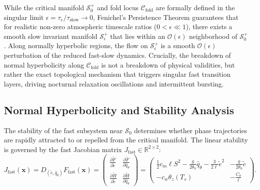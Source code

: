 \begin{remark}
\label{rem:fenichel_persistence}
While the critical manifold $\mathcal{S}_0^+$ and fold locus $\mathcal{C}_{\mathrm{fold}}$ are formally defined in the singular limit $\epsilon = \tau_e / \tau_{\mathrm{slow}} \to 0$, Fenichel's Persistence Theorem \citep{Fenichel1979} guarantees that for realistic non-zero atmospheric timescale ratios ($0 < \epsilon \ll 1$), there exists a smooth slow invariant manifold $\mathcal{S}_\epsilon^+$ that lies within an $\mathcal{O}(\epsilon)$ neighborhood of $\mathcal{S}_0^+$. Along normally hyperbolic regions, the flow on $\mathcal{S}_\epsilon^+$ is a smooth $\mathcal{O}(\epsilon)$ perturbation of the reduced fast-slow dynamics. Crucially, the breakdown of normal hyperbolicity along $\mathcal{C}_{\mathrm{fold}}$ is not a breakdown of physical validities, but rather the exact topological mechanism that triggers singular fast transition layers, driving nocturnal relaxation oscillations and intermittent bursting.
\end{remark}

\subsection{Normal Hyperbolicity and Stability Analysis}

The stability of the fast subsystem near $\mathcal{S}_0$ determines whether phase trajectories are rapidly attracted to or repelled from the critical manifold. The linear stability is governed by the fast Jacobian matrix $J_{\mathrm{fast}} \in \mathbb{R}^{2 \times 2}$:
\begin{equation}
J_{\mathrm{fast}}(\mathbf{x}) = D_{(\tilde e, \hat q_\theta)} F_{\mathrm{fast}}(\mathbf{x}) =
\begin{pmatrix}
\frac{\partial \tilde F}{\partial \tilde e} & \frac{\partial \tilde F}{\partial \hat q_\theta} \\[6pt]
\frac{\partial \tilde H}{\partial \tilde e} & \frac{\partial \tilde H}{\partial \hat q_\theta}
\end{pmatrix}
=
\begin{pmatrix}
\frac{1}{2} c_m \ell S^2 - \frac{g}{2\theta_0} \hat q_\theta - \frac{3}{2\ell} \tilde e^2 & -\frac{g}{2\theta_0} \tilde e \\[6pt]
-c_w \theta_z(T_s) & -\frac{C_\theta}{\ell}
\end{pmatrix}.
\end{equation}

